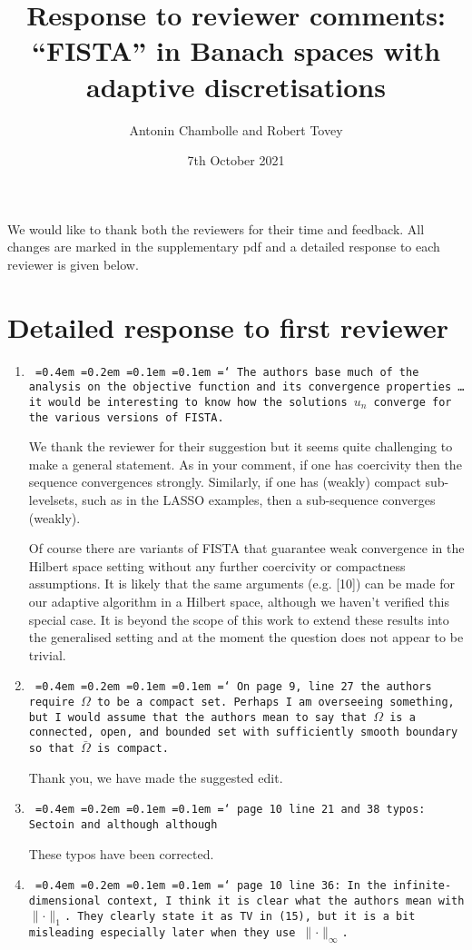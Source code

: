 \documentclass[12pt]{article}
\title{Response to reviewer comments:\\``FISTA'' in Banach spaces with adaptive discretisations}
\author{Antonin Chambolle and Robert Tovey}
\date{7th October 2021}
\newcommand*\justify{%
	\fontdimen2\font=0.4em%
	\fontdimen3\font=0.2em%
	\fontdimen4\font=0.1em%
	\fontdimen7\font=0.1em%
	\hyphenchar\font=`\-%
}
\newcommand{\review}[1]{\texttt{\justify{#1}}}
\begin{document}
\maketitle

We would like to thank both the reviewers for their time and feedback. All changes are marked in the supplementary pdf and a detailed response to each reviewer is given below.


\section{Detailed response to first reviewer}

\begin{enumerate}
	\item \review{The authors base much of the analysis on the objective function and its convergence properties \ldots it would be interesting to know how the solutions $u_n$ converge for the various versions of FISTA.} 
	
	We thank the reviewer for their suggestion but it seems quite challenging to make a general statement. As in your comment, if one has coercivity then the sequence convergences strongly. Similarly, if one has (weakly) compact sub-levelsets, such as in the LASSO examples, then a sub-sequence converges (weakly).
	
	Of course there are variants of FISTA that guarantee weak convergence in the Hilbert space setting without any further coercivity or compactness assumptions. It is likely that the same arguments (e.g. [10]) can be made for our adaptive algorithm in a Hilbert space, although we haven't verified this special case. It is beyond the scope of this work to extend these results into the generalised setting and at the moment the question does not appear to be trivial.
	
	\item \review{On page 9, line 27 the authors require $\Omega$ to be a compact set. Perhaps I am overseeing something, but I would assume that the authors mean to say that $\Omega$ is a connected, open, and bounded set with sufficiently smooth boundary so that $\bar\Omega$ is compact.}
	
	Thank you, we have made the suggested edit.

	\item \review{page 10 line 21 and 38 typos: Sectoin and although although}
	
	These typos have been corrected.
	
	\item \review{page 10 line 36: In the infinite-dimensional context, I think it is clear what the authors mean with $\lVert\cdot\rVert_1$. They clearly state it as TV in (15), but it is a bit misleading especially later when they use $\lVert\cdot\rVert_\infty$.}
	

\end{enumerate}
\end{document}
